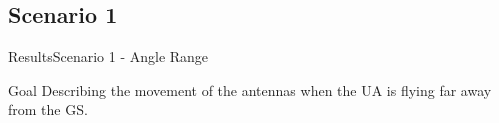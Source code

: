 \subsection{Scenario 1}

\begin{frame}{Results}{Scenario 1 - Angle Range}

  \begin{block}{Goal}
	Describing the movement of the antennas when the UA is flying far away from the GS. 
  \end{block}

  \begin{figure}[H]
    \centerline{
    \hfill
    }
  \end{figure}

\end{frame}



